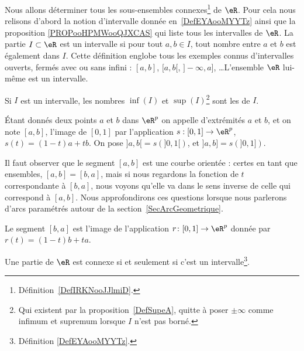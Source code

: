 Nous allons déterminer tous les sous-ensembles connexes\footnote{Définition~\ref{DefIRKNooJJlmiD}.} de $\eR$. Pour cela nous relisons d'abord la notion d'intervalle donnée en~\ref{DefEYAooMYYTz} ainsi que la proposition \ref{PROPooHPMWooQJXCAS} qui liste tous les intervalles de \( \eR\). La partie \( I\subset \eR\) est un intervalle si pour tout \( a,b\in I\), tout nombre entre \( a\) et \( b\) est également dans \( I\). Cette définition englobe tous les exemples connus d'intervalles ouverts, fermés avec ou sans infini : $[a,b]$, $[a,b[$, $]-\infty,a]$, \ldots L'ensemble \( \eR\) lui-même est un intervalle.

Si \( I\) est un intervalle, les nombres \( \inf(I)\) et \( \sup(I)\)\footnote{Qui existent par la proposition~\ref{DefSupeA}, quitte à poser \( \pm\infty\) comme infimum et supremum lorsque \( I\) n'est pas borné.} sont les  de \( I\).

\begin{definition}      \label{DefLISOooDHLQrl}
	Étant donnés deux points $a$ et $b$ dans $\eR^p$ on appelle  d'extrémités $a$ et $b$, et on note $[a,b]$, l'image de $[0,1]$ par l'application $s: [0,1]\to \eR^p$, $s(t)= (1-t)a+tb$.  On pose $]a,b[=s\left(]0,1[\right)$, et  $]a,b]=s\left(]0,1]\right)$.
\end{definition}
Il faut observer que le segment $[a,b]$ est une courbe orientée : certes en tant que ensembles, $[a,b]=[b,a]$, mais si nous regardons la fonction de $t$ correspondante à $[b,a]$, nous voyons qu'elle va dans le sens inverse de celle qui correspond à $[a,b]$. Nous approfondirons ces questions lorsque nous parlerons d'arcs paramétrés autour de la section~\ref{SecArcGeometrique}.

Le segment $[b,a]$ est l'image de l'application $r\colon [0,1]\to \eR^p$ donnée par $r(t)=(1-t)b+ta$.

\begin{proposition} \label{PropInterssiConn}
    Une partie de $\eR$ est connexe si et seulement si c'est un intervalle\footnote{Définition \ref{DefEYAooMYYTz}.}.
\end{proposition}

